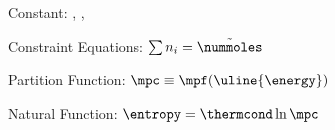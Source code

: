 \begin{bigmdframed}

    
\begin{listone}
    
    \item Constant: \nummoles, \uline{\vol}, \uline{\energy}
    
    \item Constraint Equations: $\sum\nolimits n_{i} = \tilde{\nummoles}$     %
    
    \item Partition Function: $\mpc \equiv \mpf(\uline{\energy})$
           
    \item Natural Function: $\entropy = \thermcond\ln\mpc$
    
\end{listone}			

\end{bigmdframed}